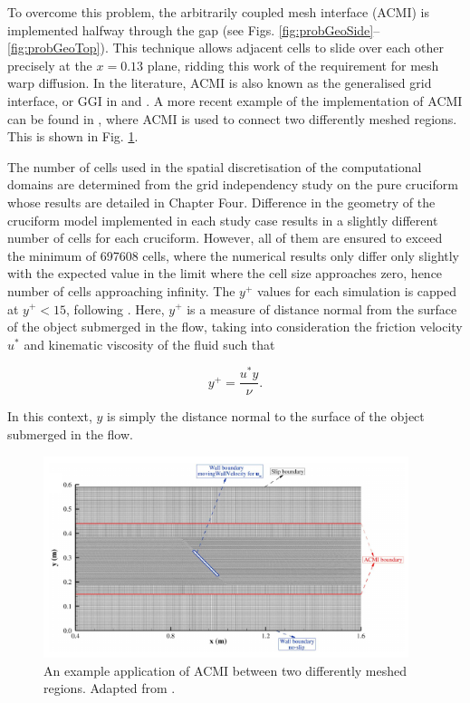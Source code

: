 \documentclass[oneside]{utmthesis}
\begin{document}
To overcome this problem, the arbitrarily coupled mesh interface (ACMI) is implemented halfway through the gap (see Figs. \ref{fig:probGeoSide}--\ref{fig:probGeoTop}). This technique allows adjacent cells to slide over each other precisely at the $x = 0.13$ plane, ridding this work of the requirement for mesh warp diffusion. In the literature, ACMI is also known as the generalised grid interface, or GGI in \citep{Zhang2018} and \citet{Sun2019b}. A more recent example of the implementation of ACMI can be found in \citet{Yang2022}, where ACMI is used to connect two differently meshed regions. This is shown in Fig. \ref{fig:acmi}.

The number of cells used in the spatial discretisation of the computational domains are determined from the grid independency study on the pure cruciform whose results are detailed in Chapter Four. Difference in the geometry of the cruciform model implemented in each study case results in a slightly different number of cells for each cruciform. However, all of them are ensured to exceed the minimum of 697608 cells, where the numerical results only differ only slightly with the expected value in the limit where the cell size approaches zero, hence number of cells approaching infinity. The $y^{+}$ values for each simulation is capped at $y^{+}< 15$, following \citet{Wang2019}. Here, $y^{+}$ is a measure of distance normal from the surface of the object submerged in the flow, taking into consideration the friction velocity $u^{*}$ \citep{Bhukta2018} and kinematic viscosity of the fluid such that

\begin{equation}
  y^{+} = \frac{u^{*} y}{\nu}.
  \label{eq:yplus}
\end{equation}

\noindent In this context, $y$ is simply the distance normal to the surface of the object submerged in the flow.

\begin{figure}[!h]
  \centering
  \hspace{1cm} \includegraphics[width=0.95\textwidth]{figs/acmi}
  \caption{An example application of ACMI between two differently meshed regions. Adapted from \citet{Yang2022}.}
  \label{fig:acmi}
\end{figure}
\end{document}
